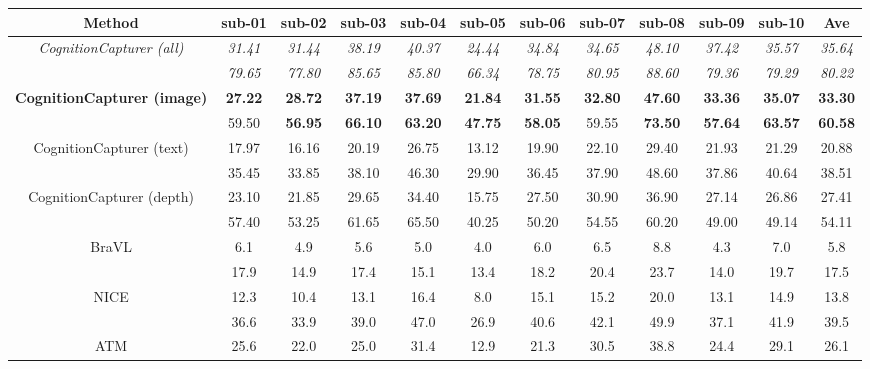 \documentclass[letterpaper]{article} %
\begin{document}
\begin{table}[ht]
\centering
\setlength{\tabcolsep}{1mm}
\begin{tabular}{c|ccccccccccc}
\hline
Method & sub-01 & sub-02 & sub-03 & sub-04 & sub-05 & sub-06 & sub-07 & sub-08 & sub-09 & sub-10 & Ave \\ \hline
\multirow{2}{*}{\textit{CognitionCapturer (all)}}& \textit{31.41} & \textit{31.44} & \textit{38.19} & \textit{40.37} & \textit{24.44} & \textit{34.84} & \textit{34.65} & \textit{48.10} & \textit{37.42} & \textit{35.57} & \textit{35.64} \\
 & \textit{79.65} & \textit{77.80} & \textit{85.65} & \textit{85.80} & \textit{66.34} & \textit{78.75} & \textit{80.95} & \textit{88.60} & \textit{79.36} & \textit{79.29} & \textit{80.22} \\ \hline
\multirow{2}{*}{\textbf{CognitionCapturer (image)}} & \textbf{27.22} & \textbf{28.72} & \textbf{37.19} & \textbf{37.69} & \textbf{21.84} & \textbf{31.55} & \textbf{32.80} & \textbf{47.60} & \textbf{33.36} & \textbf{35.07} & \textbf{33.30} \\
 & 59.50 & \textbf{56.95} & \textbf{66.10} & \textbf{63.20} & \textbf{47.75} & \textbf{58.05} & 59.55 & \textbf{73.50} & \textbf{57.64} & \textbf{63.57} & \textbf{60.58} \\ \hline
\multirow{2}{*}{CognitionCapturer (text)} & 17.97 & 16.16 & 20.19 & 26.75 & 13.12 & 19.90 & 22.10 & 29.40 & 21.93 & 21.29 & 20.88 \\
 & 35.45 & 33.85 & 38.10 & 46.30 & 29.90 & 36.45 & 37.90 & 48.60 & 37.86 & 40.64 & 38.51 \\ \hline
\multirow{2}{*}{CognitionCapturer (depth)} & 23.10 & 21.85 & 29.65 & 34.40 & 15.75 & 27.50 & 30.90 & 36.90 & 27.14 & 26.86 & 27.41 \\
 & 57.40 & 53.25 & 61.65 & 65.50 & 40.25 & 50.20 & 54.55 & 60.20 & 49.00 & 49.14 & 54.11 \\ \hline
\multirow{2}{*}{BraVL \cite{du2023decoding}} & 6.1 & 4.9 & 5.6 & 5.0 & 4.0 & 6.0 & 6.5 & 8.8 & 4.3 & 7.0 & 5.8 \\
 & 17.9 & 14.9 & 17.4 & 15.1 & 13.4 & 18.2 & 20.4 & 23.7 & 14.0 & 19.7 & 17.5 \\ \hline
\multirow{2}{*}{NICE \cite{song2024decoding}} & 12.3 & 10.4 & 13.1 & 16.4 & 8.0 & 15.1 & 15.2 & 20.0 & 13.1 & 14.9 & 13.8 \\
 & 36.6 & 33.9 & 39.0 & 47.0 & 26.9 & 40.6 & 42.1 & 49.9 & 37.1 & 41.9 & 39.5 \\ \hline
\multirow{2}{*}{ATM \cite{li2024visualdecodingreconstructioneeg}} & 25.6 & 22.0 & 25.0 & 31.4 & 12.9 & 21.3 & 30.5 & 38.8 & 24.4 & 29.1 & 26.1 \\

\end{tabular}
\end{table}
\end{document}
